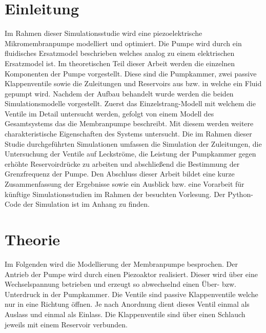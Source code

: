 \documentclass[fontsize=12pt, a4paper]{scrartcl}
\begin{document}
\tableofcontents            %


\newpage

\section{Einleitung}
Im Rahmen dieser Simulationsstudie wird eine piezoelektrische Mikromembranpumpe modelliert und optimiert. Die Pumpe wird durch ein fluidisches Ersatzmodel beschrieben welches analog zu einem elektrischen Ersatzmodel ist. Im theoretischen Teil dieser Arbeit werden die einzelnen Komponenten der Pumpe vorgestellt. Diese sind die Pumpkammer, zwei passive Klappenventile sowie die Zuleitungen und Reservoirs aus bzw. in welche ein Fluid gepumpt wird. Nachdem der Aufbau behandelt wurde werden die beiden Simulationsmodelle vorgestellt. Zuerst das Einzelstrang-Modell mit welchem die Ventile im Detail untersucht werden, gefolgt von einem Modell des Gesamtsystems das die Membranpumpe beschreibt. Mit diesem werden weitere charakteristische Eigenschaften des Systems untersucht. Die im Rahmen dieser Studie durchgeführten Simulationen umfassen die Simulation der Zuleitungen, die Untersuchung der Ventile auf Leckströme, die Leistung der Pumpkammer gegen erhöhte Reservoirdrücke zu arbeiten und abschließend die Bestimmung der Grenzfrequenz der Pumpe. Den Abschluss dieser Arbeit bildet eine kurze Zusammenfassung der Ergebnisse sowie ein Ausblick bzw. eine Vorarbeit für künftige Simulationsstudien im Rahmen der besuchten Vorlesung. Der Python-Code der Simulation ist im Anhang zu finden.

\section{Theorie}

Im Folgenden wird die Modellierung der Membranpumpe besprochen. Der Antrieb der Pumpe wird durch einen Piezoaktor realisiert. Dieser wird über eine Wechselspannung betrieben und erzeugt so abwechselnd einen Über- bzw. Unterdruck in der Pumpkammer. Die Ventile sind passive Klappenventile welche nur in eine Richtung öffnen. Je nach Anordnung dient dieses Ventil einmal als Auslass und einmal als Einlass. Die Klappenventile sind über einen Schlauch jeweils mit einem Reservoir verbunden.
\end{document}

